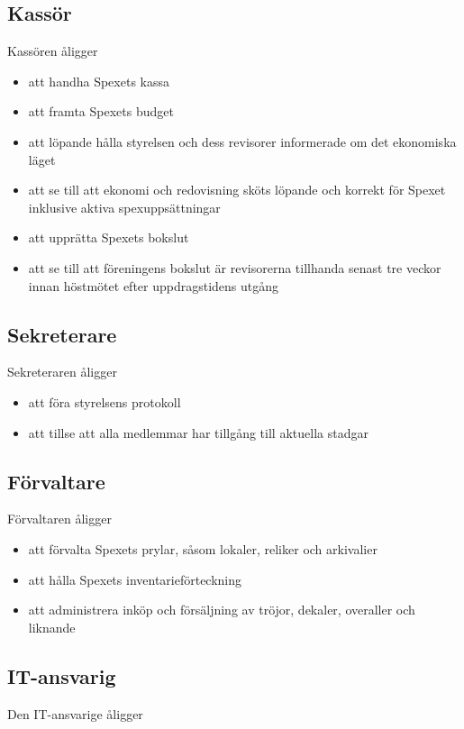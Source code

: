 \documentclass[a4paper]{article}
\begin{document}
\subsection{Kassör}
Kassören åligger

\begin{itemize}
  \item att handha Spexets kassa
  \item att framta Spexets budget
  \item att löpande hålla styrelsen och dess revisorer informerade om det ekonomiska läget
  \item att se till att ekonomi och redovisning sköts löpande och korrekt för Spexet inklusive aktiva spexuppsättningar
  \item att upprätta Spexets bokslut
  \item att se till att föreningens bokslut är revisorerna tillhanda senast tre veckor innan höstmötet efter uppdragstidens utgång
\end{itemize}

\subsection{Sekreterare}
Sekreteraren åligger

\begin{itemize}
  \item att föra styrelsens protokoll
  \item att tillse att alla medlemmar har tillgång till aktuella stadgar
\end{itemize}

\subsection{Förvaltare}
Förvaltaren åligger

\begin{itemize}
  \item att förvalta Spexets prylar, såsom lokaler, reliker och arkivalier
  \item att hålla Spexets inventarieförteckning
  \item att administrera inköp och försäljning av tröjor, dekaler, overaller och liknande
\end{itemize}

\subsection{IT-ansvarig}
Den IT-ansvarige åligger
\end{document}
